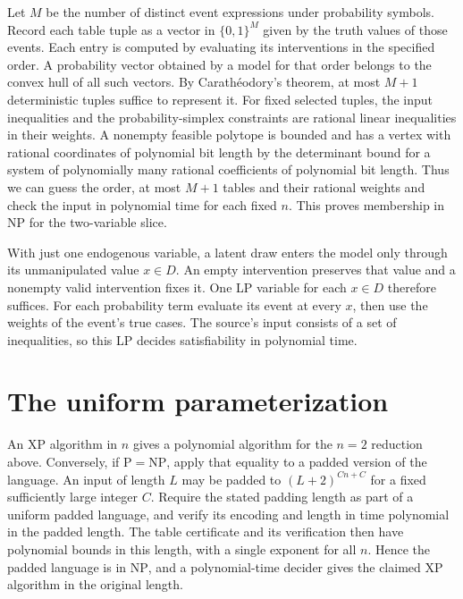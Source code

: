 \documentclass[11pt]{amsart}
\begin{document}
Let \(M\) be the number of distinct event expressions under probability symbols. Record each table tuple as a vector in \(\{0,1\}^M\) given by the truth values of those events. Each entry is computed by evaluating its interventions in the specified order. A probability vector obtained by a model for that order belongs to the convex hull of all such vectors. By Carath\'eodory's theorem, at most \(M+1\) deterministic tuples suffice to represent it. For fixed selected tuples, the input inequalities and the probability-simplex constraints are rational linear inequalities in their weights. A nonempty feasible polytope is bounded and has a vertex with rational coordinates of polynomial bit length by the determinant bound for a system of polynomially many rational coefficients of polynomial bit length. Thus we can guess the order, at most \(M+1\) tables and their rational weights and check the input in polynomial time for each fixed \(n\). This proves membership in \(\mathrm{NP}\) for the two-variable slice.

With just one endogenous variable, a latent draw enters the model only through its unmanipulated value \(x\in D\). An empty intervention preserves that value and a nonempty valid intervention fixes it. One LP variable for each \(x\in D\) therefore suffices. For each probability term evaluate its event at every \(x\), then use the weights of the event's true cases. The source's input consists of a set of inequalities, so this LP decides satisfiability in polynomial time.

\section{The uniform parameterization}
An XP algorithm in \(n\) gives a polynomial algorithm for the \(n=2\) reduction above. Conversely, if \(\mathrm{P}=\mathrm{NP}\), apply that equality to a padded version of the language. An input of length \(L\) may be padded to \((L+2)^{Cn+C}\) for a fixed sufficiently large integer \(C\). Require the stated padding length as part of a uniform padded language, and verify its encoding and length in time polynomial in the padded length. The table certificate and its verification then have polynomial bounds in this length, with a single exponent for all \(n\). Hence the padded language is in \(\mathrm{NP}\), and a polynomial-time decider gives the claimed XP algorithm in the original length.
\end{document}
